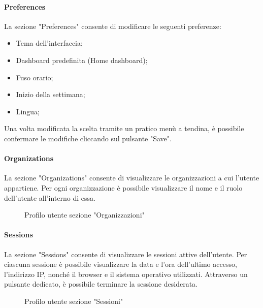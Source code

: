 \paragraph{Preferences}
La sezione "Preferences" consente di modificare le seguenti preferenze:
\begin{itemize}
    \item Tema dell'interfaccia;
    \item Dashboard predefinita (Home dashboard);
    \item Fuso orario;
    \item Inizio della settimana;
    \item Lingua;
\end{itemize}
Una volta modificata la scelta tramite un pratico menù a tendina, è possibile confermare le modifiche cliccando sul pulsante "Save".\\
\paragraph{Organizations}
La sezione "Organizations" consente di visualizzare le organizzazioni a cui l'utente appartiene. Per ogni organizzazione è possibile visualizzare il nome e il ruolo dell'utente all'interno di essa.
\begin{figure}[H]
    \centering
    \caption{Profilo utente sezione "Organizzazioni"}
    \label{fig:my_label}
\end{figure}
\paragraph{Sessions}
La sezione "Sessions" consente di visualizzare le sessioni attive dell'utente. Per ciascuna sessione è possibile visualizzare la data e l'ora dell'ultimo accesso, l'indirizzo IP, nonché il browser e il sistema operativo utilizzati. Attraverso un pulsante dedicato, è possibile terminare la sessione desiderata.
\begin{figure}[H]
    \centering
    \caption{Profilo utente sezione "Sessioni"}
    \label{fig:my_label}
\end{figure}

